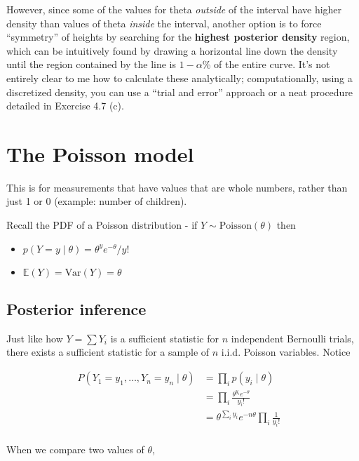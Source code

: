 \documentclass[]{article}
\providecommand{\tightlist}{%
  \setlength{\itemsep}{0pt}\setlength{\parskip}{0pt}}
\begin{document}
However, since some of the values for theta \emph{outside} of the
interval have higher density than values of theta \emph{inside} the
interval, another option is to force ``symmetry'' of heights by
searching for the \textbf{highest posterior density} region, which can
be intuitively found by drawing a horizontal line down the density until
the region contained by the line is \(1 - \alpha\)\% of the entire
curve. It's not entirely clear to me how to calculate these
analytically; computationally, using a discretized density, you can use
a ``trial and error'' approach or a neat procedure detailed in Exercise
4.7 (c).

\hypertarget{the-poisson-model}{%
\section{The Poisson model}\label{the-poisson-model}}

This is for measurements that have values that are whole numbers, rather
than just 1 or 0 (example: number of children).

Recall the PDF of a Poisson distribution - if
\(Y \sim \text{Poisson}(\theta)\) then

\begin{itemize}
\tightlist
\item
  \(p(Y = y \mid \theta) = \theta^y e^{-\theta} / y!\)
\item
  \(\mathbb{E}(Y) = \text{Var}(Y) = \theta\)
\end{itemize}

\hypertarget{posterior-inference}{%
\subsection{Posterior inference}\label{posterior-inference}}

Just like how \(Y = \sum Y_i\) is a sufficient statistic for \(n\)
independent Bernoulli trials, there exists a sufficient statistic for a
sample of \(n\) i.i.d. Poisson variables. Notice

\begin{align}
P(Y_1 = y_1, \dots, Y_n = y_n \mid \theta) &=
\prod_i p(y_i \mid \theta) \\
&= \prod_i \frac{\theta^{y_i} e^{-\theta}}{y_i !} \\
&= \theta^{\sum_i y_i} e^{-n \theta} \prod_i \frac{1}{y_i !} & \\
\end{align}

When we compare two values of \(\theta\),
\end{document}
